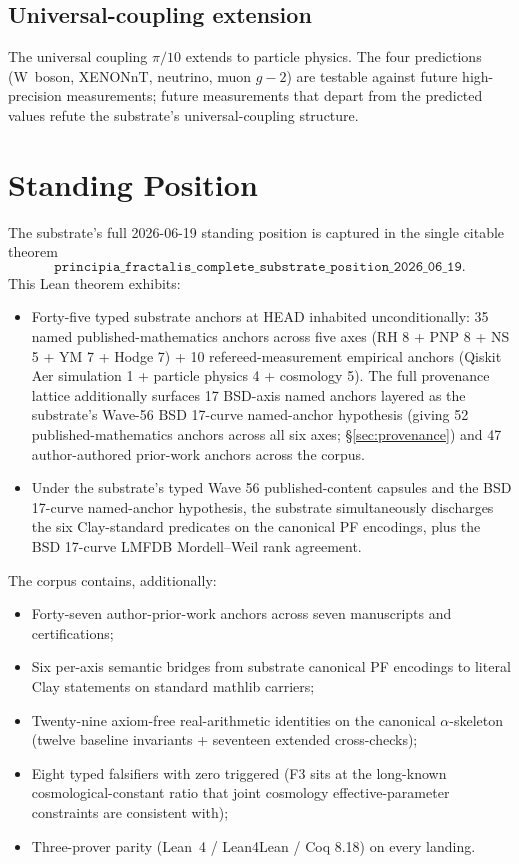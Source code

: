 \documentclass[11pt,a4paper]{amsart}
\theoremstyle{plain}
\theoremstyle{definition}
\begin{document}
\subsection{Universal-coupling extension}

The universal coupling $\pi/10$ extends to particle physics. The four predictions (W~boson, XENONnT, neutrino, muon $g-2$) are testable against future high-precision measurements; future measurements that depart from the predicted values refute the substrate's universal-coupling structure.

\section{Standing Position}\label{sec:standing-position}

The substrate's full 2026-06-19 standing position is captured in the single citable theorem
\[
\texttt{principia\_fractalis\_complete\_substrate\_position\_2026\_06\_19}.
\]
This Lean theorem exhibits:
\begin{itemize}[itemsep=2pt]
\item Forty-five typed substrate anchors at HEAD inhabited unconditionally:
35 named published-mathematics anchors across five axes (RH 8 + PNP 8 + NS 5 + YM 7 + Hodge 7) + 10 refereed-measurement empirical anchors (Qiskit Aer simulation 1 + particle physics 4 + cosmology 5). The full provenance lattice additionally surfaces 17 BSD-axis named anchors layered as the substrate's Wave-56 BSD 17-curve named-anchor hypothesis (giving 52 published-mathematics anchors across all six axes; \S\ref{sec:provenance}) and 47 author-authored prior-work anchors across the corpus.
\item Under the substrate's typed Wave 56 published-content capsules and the BSD 17-curve named-anchor hypothesis, the substrate simultaneously discharges the six Clay-standard predicates on the canonical PF encodings, plus the BSD 17-curve LMFDB Mordell--Weil rank agreement.
\end{itemize}

The corpus contains, additionally:
\begin{itemize}[itemsep=2pt]
\item Forty-seven author-prior-work anchors across seven manuscripts and certifications;
\item Six per-axis semantic bridges from substrate canonical PF encodings to literal Clay statements on standard mathlib carriers;
\item Twenty-nine axiom-free real-arithmetic identities on the canonical $\alpha$-skeleton (twelve baseline invariants + seventeen extended cross-checks);
\item Eight typed falsifiers with zero triggered (F3 sits at the long-known cosmological-constant ratio that joint cosmology effective-parameter constraints are consistent with);
\item Three-prover parity (Lean~4 / Lean4Lean / Coq 8.18) on every landing.
\end{itemize}
\end{document}
